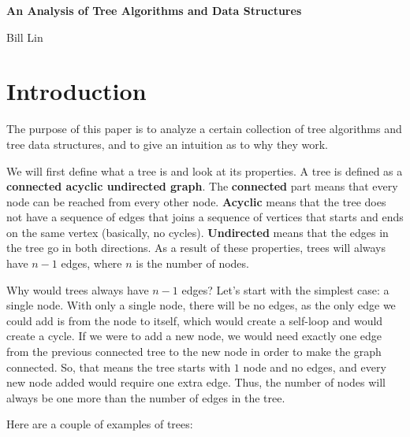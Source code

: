 \documentclass{article}
\begin{document}
\begin{center}
    \Large
    \textbf{An Analysis of Tree Algorithms and Data Structures}
        
    \vspace{0.4cm}
    \large{Bill Lin}
\end{center}

\section{Introduction}

The purpose of this paper is to analyze a certain collection of tree algorithms and tree data structures, and to give an intuition as to why they work.

We will first define what a tree is and look at its properties. A tree is defined as a \textbf{connected acyclic undirected graph}. The \textbf{connected} part means that every node can be reached from every other node. \textbf{Acyclic} means that the tree does not have a sequence of edges that joins a sequence of vertices that starts and ends on the same vertex (basically, no cycles). \textbf{Undirected} means that the edges in the tree go in both directions. As a result of these properties, trees will always have $n - 1$ edges, where $n$ is the number of nodes.

Why would trees always have $n - 1$ edges? Let's start with the simplest case: a single node. With only a single node, there will be no edges, as the only edge we could add is from the node to itself, which would create a self-loop and would create a cycle. If we were to add a new node, we would need exactly one edge from the previous connected tree to the new node in order to make the graph connected. So, that means the tree starts with $1$ node and no edges, and every new node added would require one extra edge. Thus, the number of nodes will always be one more than the number of edges in the tree.

Here are a couple of examples of trees:\\
\end{document}
